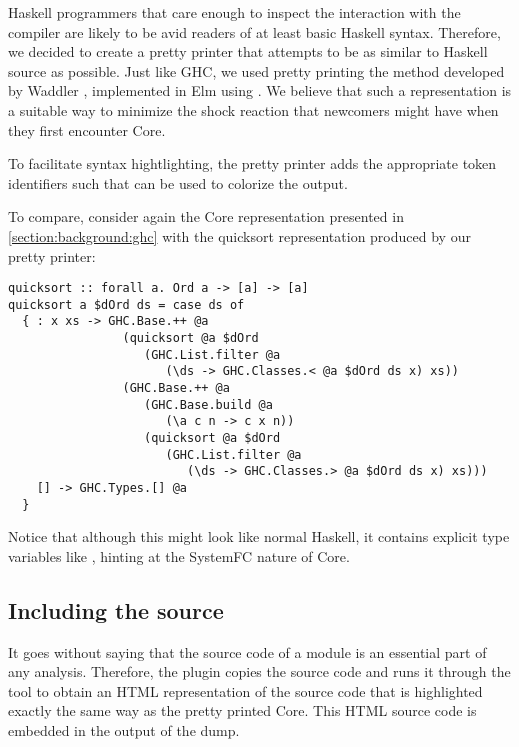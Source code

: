 Haskell programmers that care enough to inspect the interaction with the compiler are likely to be
avid readers of at least basic Haskell syntax. Therefore, we decided to create a pretty printer that attempts
to be as similar to Haskell source as possible. Just like GHC, we used pretty printing the method developed 
by Waddler \cite{prettier_printer}, implemented in Elm using  \cite{prettier_printer_elm}.
We believe that such a representation is a suitable way to minimize the shock reaction that newcomers might have
when they first encounter Core.

To facilitate syntax hightlighting, the pretty printer adds the appropriate token identifiers such that 
 \cite{pygments} can be used to colorize the output.

To compare, consider again the Core representation presented in \cref{section:background:ghc} with the quicksort
representation produced by our pretty printer:

\begin{listing}[H]
\begin{verbatim}
quicksort :: forall a. Ord a -> [a] -> [a]
quicksort a $dOrd ds = case ds of
  { : x xs -> GHC.Base.++ @a
                (quicksort @a $dOrd
                   (GHC.List.filter @a
                      (\ds -> GHC.Classes.< @a $dOrd ds x) xs))
                (GHC.Base.++ @a
                   (GHC.Base.build @a
                      (\a c n -> c x n))
                   (quicksort @a $dOrd
                      (GHC.List.filter @a
                         (\ds -> GHC.Classes.> @a $dOrd ds x) xs)))
    [] -> GHC.Types.[] @a
  }
\end{verbatim}
\end{listing}

Notice that although this might look like normal Haskell, it contains explicit type variables like
, hinting at the SystemFC nature of Core.

\subsection{Including the source}
It goes without saying that the source code of a module is an essential part of any analysis. Therefore,
the plugin copies the source code and runs it through the  \cite{pygments} tool to obtain
an HTML representation of the source code that is highlighted exactly the same way as the pretty printed Core.
This HTML source code is embedded in the output of the dump.

